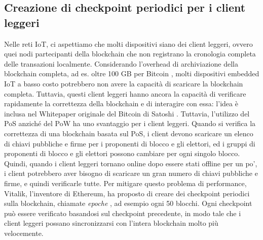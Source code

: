 \subsection{Creazione di checkpoint periodici per i client leggeri}
Nelle reti IoT, ci aspettiamo che molti dispositivi siano dei client leggeri, ovvero quei nodi partecipanti della blockchain che non registrano la cronologia completa delle transazioni localmente. Considerando l'overhead di archiviazione della blockchain completa, ad es. oltre 100 GB per Bitcoin \cite{c4}, molti dispositivi embedded IoT a basso costo potrebbero non avere la capacità di scaricare la blockchain completa. Tuttavia, questi client leggeri hanno ancora la capacità di verificare rapidamente la correttezza della blockchain e di interagire con essa: l'idea è inclusa nel Whitepaper originale del Bitcoin di Satoshi \cite{c21}.
Tuttavia, l'utilizzo del PoS anziché del PoW ha uno svantaggio per i client leggeri. Quando si verifica la correttezza di una blockchain basata sul PoS, i client devono scaricare un elenco di chiavi pubbliche e firme per i proponenti di blocco e gli elettori, ed i gruppi di proponenti di blocco
e gli elettori possono cambiare per ogni singolo blocco. Quindi, quando i client leggeri tornano online dopo essere stati offline per un po', i client potrebbero aver bisogno di scaricare un gran numero di chiavi pubbliche e firme, e quindi verificarle tutte. Per mitigare questo problema di performance, Vitalik, l'inventore di Ethereum, ha proposto di creare dei checkpoint periodici sulla blockchain, chiamate \emph{epoche} \cite{c6}, ad esempio ogni 50 blocchi. Ogni checkpoint
può essere verificato basandosi sul checkpoint precedente, in modo tale che i client leggeri possano sincronizzarsi con l'intera blockchain molto più velocemente.

